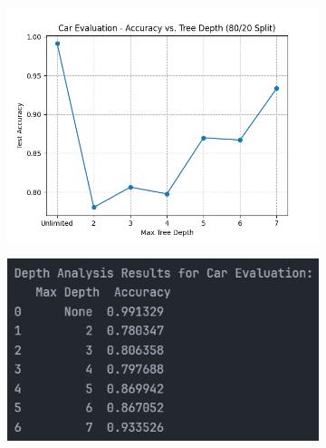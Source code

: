 \begin{figure}[H]
	\centering
	\begin{subfigure}{0.45\textwidth}
		\centering
		\includegraphics[width=\textwidth]{imgs/accuracy_vs_depth_car_evaluation.png}
	\end{subfigure}
	\hfill
	\begin{subfigure}{0.45\textwidth}
		\centering
		\includegraphics[width=\textwidth]{imgs/accuracy_vs_depth_car_evaluation__analysis.png}
	\end{subfigure}
\end{figure}

